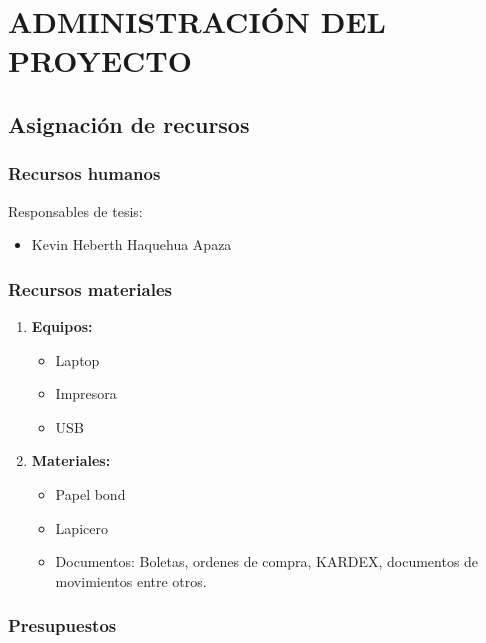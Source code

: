 \newpage
\chapter{ADMINISTRACIÓN DEL PROYECTO}
\section{Asignación de recursos}
\subsection{Recursos humanos}
Responsables de tesis:

\begin{itemize}
	\item Kevin Heberth Haquehua Apaza 
\end{itemize}

\subsection{Recursos materiales}
\begin{enumerate}[label=\Alph*]
	\item \textbf{Equipos:}
	\begin{itemize}
		\item Laptop
		\item Impresora
		\item USB 
	\end{itemize}
	\item \textbf{Materiales:}
	\begin{itemize}
	 	\item Papel bond
	 	\item Lapicero
	 	\item Documentos: Boletas, ordenes de compra, KARDEX, documentos de movimientos entre otros. 
	 \end{itemize} 
\end{enumerate}

\newpage
\subsection{Presupuestos}

